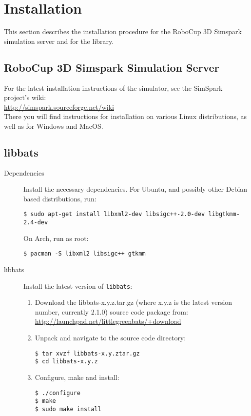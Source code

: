 \chapter{Installation}
\label{chInstallation}

This section describes the installation procedure for the RoboCup 3D Simspark simulation server and for the \libbats library.

\section{RoboCup 3D Simspark Simulation Server}

For the latest installation instructions of the simulator, see the SimSpark project's wiki: \\
\url{http://simspark.sourceforge.net/wiki}\\
There you will find instructions for installation on various Linux distributions, as well as for Windows and MacOS.

\section{libbats}

\begin{description}
  \item[Dependencies] Install the necessary dependencies. For Ubuntu, and possibly other Debian based distributions, run:
\begin{verbatim}
$ sudo apt-get install libxml2-dev libsigc++-2.0-dev libgtkmm-2.4-dev
\end{verbatim}
On Arch, run as root:
\begin{verbatim}
$ pacman -S libxml2 libsigc++ gtkmm
\end{verbatim}
  \item[libbats] Install the latest version of {\tt libbats}:
    \begin{enumerate}
      \item Download the libbats-x.y.z.tar.gz (where x.y.z is the latest version number, currently 2.1.0) source code package from: \\
        \url{http://launchpad.net/littlegreenbats/+download}
      \item Unpack and navigate to the source code directory:
\begin{verbatim}
$ tar xvzf libbats-x.y.ztar.gz
$ cd libbats-x.y.z
\end{verbatim}
      \item Configure, make and install:
\begin{verbatim}
$ ./configure
$ make
$ sudo make install
\end{verbatim}
    \end{enumerate}
\end{description}

